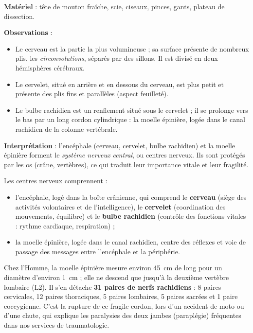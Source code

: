 \documentclass[11pt]{article}
\newcommand{\cle}[1]{{\popxbold\color{popdark}#1}}
\begin{document}
\begin{experience}
\textbf{Matériel} : tête de mouton fraîche, scie, ciseaux, pinces, gants, plateau de dissection.\par
\textbf{Observations} :
\begin{itemize}
\item Le \cle{cerveau} est la partie la plus volumineuse ; sa surface présente de nombreux plis, les \emph{circonvolutions}, séparés par des sillons. Il est divisé en deux hémisphères cérébraux.
\item Le \cle{cervelet}, situé en arrière et en dessous du cerveau, est plus petit et présente des plis fins et parallèles (aspect feuilleté).
\item Le \cle{bulbe rachidien} est un renflement situé sous le cervelet ; il se prolonge vers le bas par un long cordon cylindrique : la \cle{moelle épinière}, logée dans le canal rachidien de la colonne vertébrale.
\end{itemize}
\textbf{Interprétation} : l'encéphale (cerveau, cervelet, bulbe rachidien) et la moelle épinière forment le \emph{système nerveux central}, ou \cle{centres nerveux}. Ils sont protégés par les os (crâne, vertèbres), ce qui traduit leur importance vitale et leur fragilité.
\end{experience}

\begin{aretenir}
Les centres nerveux comprennent :
\begin{itemize}
\item l'\cle{encéphale}, logé dans la boîte crânienne, qui comprend le \textbf{cerveau} (siège des activités volontaires et de l'intelligence), le \textbf{cervelet} (coordination des mouvements, équilibre) et le \textbf{bulbe rachidien} (contrôle des fonctions vitales : rythme cardiaque, respiration) ;
\item la \cle{moelle épinière}, logée dans le canal rachidien, centre des réflexes et voie de passage des messages entre l'encéphale et la périphérie.
\end{itemize}
\end{aretenir}

\begin{savaistu}
Chez l'Homme, la moelle épinière mesure environ \SI{45}{cm} de long pour un diamètre d'environ \SI{1}{cm} ; elle ne descend que jusqu'à la deuxième vertèbre lombaire (L2). Il s'en détache \textbf{31 paires de nerfs rachidiens} : 8 paires cervicales, 12 paires thoraciques, 5 paires lombaires, 5 paires sacrées et 1 paire coccygienne. C'est la rupture de ce fragile cordon, lors d'un accident de moto ou d'une chute, qui explique les paralysies des deux jambes (paraplégie) fréquentes dans nos services de traumatologie.
\end{savaistu}
\end{document}
